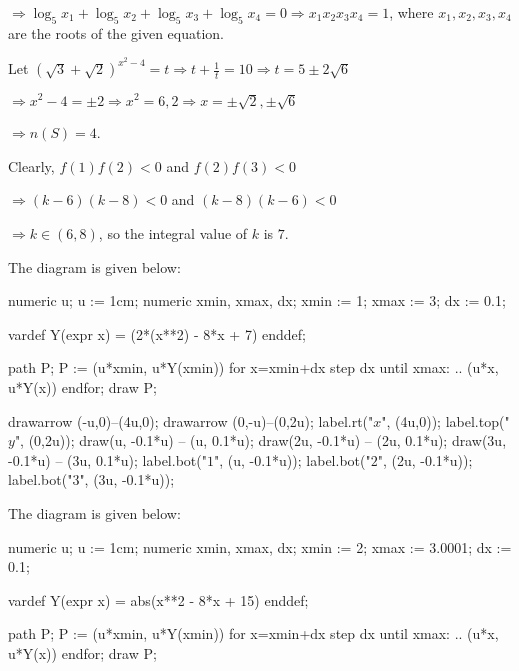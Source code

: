   $\Rightarrow \log_5x_1 + \log_5x_2 + \log_5x_3 + \log_5x_4 = 0 \Rightarrow x_1x_2x_3x_4 = 1$, where $x_1,
  x_2, x_3, x_4$ are the roots of the given equation.
\item Let $\left(\sqrt{3} + \sqrt{2}\right)^{x^2 - 4} = t \Rightarrow t + \frac{1}{t} = 10\Rightarrow t =
  5 \pm2\sqrt{6}$

  $\Rightarrow x^2 - 4 = \pm2 \Rightarrow x^2 = 6, 2\Rightarrow x = \pm\sqrt{2}, \pm\sqrt{6}$

  $\Rightarrow n(S) = 4$.
\item Clearly, $f(1)f(2) < 0$ and $f(2)f(3) < 0$

  $\Rightarrow (k - 6)(k - 8) < 0$ and $(k - 8)(k - 6) < 0$

  $\Rightarrow k\in(6, 8)$, so the integral value of $k$ is $7$.

  The diagram is given below:

  \startplacefigure[location=force]
    \startMPcode
      numeric u; u := 1cm;     %
      numeric xmin, xmax, dx;
      xmin := 1; xmax := 3; dx := 0.1;

      vardef Y(expr x) = (2*(x**2) - 8*x + 7) enddef;

      path P;
      P := (u*xmin, u*Y(xmin))
      for x=xmin+dx step dx until xmax:
      .. (u*x, u*Y(x))
      endfor;
      draw P;

      drawarrow (-u,0)--(4u,0);
      drawarrow (0,-u)--(0,2u);
      label.rt("$x$", (4u,0));
      label.top("$y$", (0,2u));
      draw(u, -0.1*u) -- (u, 0.1*u);
      draw(2u, -0.1*u) -- (2u, 0.1*u);
      draw(3u, -0.1*u) -- (3u, 0.1*u);
      label.bot("$1$", (u, -0.1*u));
      label.bot("$2$", (2u, -0.1*u));
      label.bot("$3$", (3u, -0.1*u));
    \stopMPcode
  \stopplacefigure
\item The diagram is given below:

  \startplacefigure[location=force]
    \startMPcode
      numeric u; u := 1cm;     %
      numeric xmin, xmax, dx;
      xmin := 2; xmax := 3.0001; dx := 0.1;

      vardef Y(expr x) = abs(x**2 - 8*x + 15) enddef;

      path P;
      P := (u*xmin, u*Y(xmin))
      for x=xmin+dx step dx until xmax:
      .. (u*x, u*Y(x))
      endfor;
      draw P;

